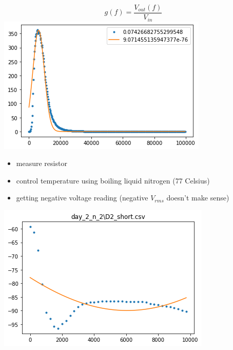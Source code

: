 \documentclass[a4paper]{tufte-handout}
\begin{document}
$$g(f) = \frac{V_{out}(f)}{V_{in}}$$
\includegraphics[width = 1 \textwidth]{figures/day1_gain.png}

\hrulefill


\begin{itemize}
    \item measure resistor
    \item control temperature using boiling liquid nitrogen (77 Celsius)
    \item getting negative voltage reading (negative $V_{rms}$ doesn't make sense)
\end{itemize}


\includegraphics[width = 1     \textwidth]{figures/day2_bad.png}
\end{document}

